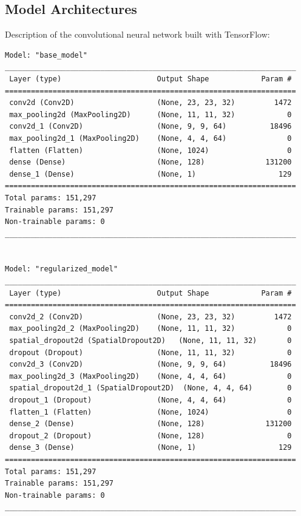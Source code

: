 \documentclass[
a4paper,     %
10pt         %
]{scrartcl}  %
\begin{document}
\subsection{Model Architectures}
\label{subsec:model_arch}
Description of the convolutional neural network built with TensorFlow:
\begin{verbatim}
Model: "base_model"
___________________________________________________________________
 Layer (type)                      Output Shape            Param #
===================================================================
 conv2d (Conv2D)                   (None, 23, 23, 32)         1472
 max_pooling2d (MaxPooling2D)      (None, 11, 11, 32)            0
 conv2d_1 (Conv2D)                 (None, 9, 9, 64)          18496
 max_pooling2d_1 (MaxPooling2D)    (None, 4, 4, 64)              0
 flatten (Flatten)                 (None, 1024)                  0
 dense (Dense)                     (None, 128)              131200
 dense_1 (Dense)                   (None, 1)                   129
===================================================================
Total params: 151,297
Trainable params: 151,297
Non-trainable params: 0
___________________________________________________________________


Model: "regularized_model"
___________________________________________________________________
 Layer (type)                      Output Shape            Param #
===================================================================
 conv2d_2 (Conv2D)                 (None, 23, 23, 32)         1472
 max_pooling2d_2 (MaxPooling2D)    (None, 11, 11, 32)            0
 spatial_dropout2d (SpatialDropout2D)   (None, 11, 11, 32)       0
 dropout (Dropout)                 (None, 11, 11, 32)            0
 conv2d_3 (Conv2D)                 (None, 9, 9, 64)          18496
 max_pooling2d_3 (MaxPooling2D)    (None, 4, 4, 64)              0
 spatial_dropout2d_1 (SpatialDropout2D)  (None, 4, 4, 64)        0
 dropout_1 (Dropout)               (None, 4, 4, 64)              0
 flatten_1 (Flatten)               (None, 1024)                  0
 dense_2 (Dense)                   (None, 128)              131200
 dropout_2 (Dropout)               (None, 128)                   0
 dense_3 (Dense)                   (None, 1)                   129
===================================================================
Total params: 151,297
Trainable params: 151,297
Non-trainable params: 0
___________________________________________________________________
\end{verbatim}
\end{document}

